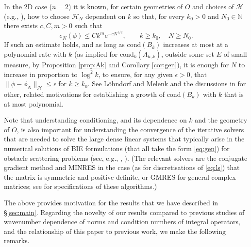 \documentclass{birkjour}
\theoremstyle{definition}
\theoremstyle{remark}
\numberwithin{equation}{section}
\newcommand{\N}{\mathbb{N}}
\newcommand{\cH}{\mathcal{H}}
\newcommand{\cond}{\mathrm{cond}}
\newcommand{\re}{\mathrm{e}}
\begin{document}
In the 2D case ($n=2$) it is known, for certain geometries of $O$ and choices of $\cH$ (e.g., \cite{HeLaMe:13,ChHeLaTw:15,HeLaCh:15}), how to choose $\cH_N$ dependent on $k$ so that, for every $k_0>0$ and $N_0\in \N$ there exists $c,C,m>0$ such that
$$
e_N(\phi) \leq Ck^m \re^{-cN^{1/2}}, \qquad k\geq k_0, \quad N\geq N_0.
$$
If such an estimate holds, and as long as $\cond(B_k)$ increases at most at a polynomial rate with $k$ (as implied for $\cond_k(A_{k,k})$, outside some set $E$ of small measure, by Proposition \ref{prop:Ak} and Corollary \ref{cor:gen}), it is enough for $N$ to increase in proportion to $\log^2 k$, to ensure, for any given $\epsilon>0$, that $\|\phi -\phi_N\|_\cH\leq \epsilon$ for $k\geq k_0$.   See L\"ohndorf and Melenk \cite{LoMe:11} and the discussions in \cite{chandler2020high,lafontaine2021most} for other, related motivations for establishing a growth of $\cond(B_k)$ with $k$ that is at most polynomial.

Note that understanding conditioning, and its dependence on $k$ and the geometry of $O$, is also important for understanding the convergence of the iterative solvers that are needed to solve the large dense linear systems that typically arise in the numerical solutions of BIE formulations (that all take the form \eqref{eq:gen}) for obstacle scattering problems (see, e.g., \cite{Gr:97,AnDa:21,MaGaSpSp:22}, \cite[Thm.~4.11]{ChSp:24}). (The relevant solvers are the conjugate gradient method and MINRES in the case (as for discretisations of \eqref{eq:ls}) that the matrix is symmetric and positive definite, or GMRES for general complex matrices; see \cite{Gr:97} for specifications of these algorithms.)

The above provides motivation for the results that we have described in \S\ref{sec:main}. Regarding the novelty of our results compared to previous studies of wavenumber dependence of norms and condition numbers of integral operators, and the relationship of this paper to previous work, we make the following remarks.
\end{document}
